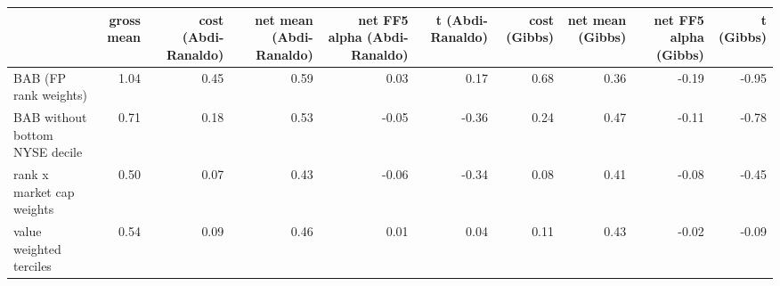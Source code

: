 \begin{tabular}{lrrrrrrrrr}
\toprule
 & gross mean & cost (Abdi-Ranaldo) & net mean (Abdi-Ranaldo) & net FF5 alpha (Abdi-Ranaldo) & t (Abdi-Ranaldo) & cost (Gibbs) & net mean (Gibbs) & net FF5 alpha (Gibbs) & t (Gibbs) \\
\midrule
BAB (FP rank weights) & 1.04 & 0.45 & 0.59 & 0.03 & 0.17 & 0.68 & 0.36 & -0.19 & -0.95 \\
BAB without bottom NYSE decile & 0.71 & 0.18 & 0.53 & -0.05 & -0.36 & 0.24 & 0.47 & -0.11 & -0.78 \\
rank x market cap weights & 0.50 & 0.07 & 0.43 & -0.06 & -0.34 & 0.08 & 0.41 & -0.08 & -0.45 \\
value weighted terciles & 0.54 & 0.09 & 0.46 & 0.01 & 0.04 & 0.11 & 0.43 & -0.02 & -0.09 \\
\bottomrule
\end{tabular}
